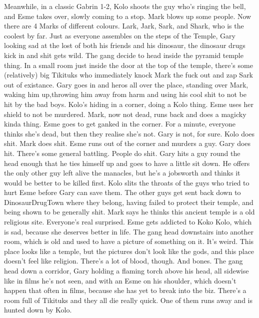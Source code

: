 Meanwhile, in a classic Gabrin 1-2, Kolo shoots the guy who’s ringing the bell, and Esme takes over, slowly coming to a stop.\medskip
Mark blows up some people.\medskip
Now there are 4 Marks of different colours. Lark, Jark, Sark, and Shark, who is the coolest by far.\medskip
Just as everyone assembles on the steps of the Temple, Gary looking sad at the lost of both his friends and his dinosaur, the dinosaur drugs kick in and shit gets wild.\medskip
The gang decide to head inside the pyramid temple thing.\medskip
In a small room just inside the door at the top of the temple, there’s some (relatively) big Tikituks who immediately knock Mark the fuck out and zap Sark out of existance.\medskip
Gary goes in and heros all over the place, standing over Mark, waking him up,throwing him away from harm and using his cool shit to not be hit by the bad boys.\medskip
Kolo’s hiding in a corner, doing a Kolo thing. Esme uses her shield to not be murdered.\medskip
Mark, now not dead, runs back and does a magicky kinda thing.\medskip
Esme goes to get ganked in the corner. For a minute, everyone thinks she’s dead, but then they realise she’s not. Gary is not, for sure.\medskip
Kolo does shit.\medskip
Mark does shit.\medskip
Esme runs out of the corner and murders a guy.\medskip
Gary does hit.\medskip
There’s some general battling. People do shit.\medskip
Gary hits a guy round the head enough that he ties himself up and goes to have a little sit down. He offers the only other guy left alive the manacles, but he’s a jobsworth and thinks it would be better to be killed first.\medskip
Kolo slits the throats of the guys who tried to hurt Esme before Gary can save them. The other guys get sent back down to DinosaurDrugTown where they belong, having failed to protect their temple, and being shown to be generally shit.\medskip
Mark says he thinks this ancient temple is a old religious site. Everyone’s real surprised.\medskip
Esme gets addicted to Koko Kolo, which is sad, because she deserves better in life.\medskip
The gang head downstairs into another room, which is old and used to have a picture of something on it. It’s weird. This place looks like a temple, but the pictures don’t look like the gods, and this place doesn’t feel like religion.\medskip
There’s a lot of blood, though.\medskip
And bones.\medskip
The gang head down a corridor, Gary holding a flaming torch above his head, all sidewise like in films he’s not seen, and with an Esme on his shoulder, which doesn’t happen that often in films, because she has yet to break into the biz.\medskip
There’s a room full of Tikituks and they all die really quick. One of them runs away and is hunted down by Kolo.\medskip
